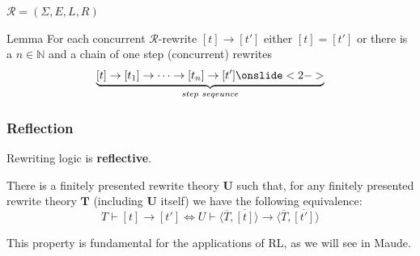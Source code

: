 \documentclass{beamer}
\begin{document}
\begin{frame}
    $\mathcal{R} = (\Sigma, E, L, R)$
    \small
    \begin{block}{Lemma}
        For each concurrent $\mathcal{R}$-rewrite $[t] \rightarrow [t']$
        either $[t] = [t']$ or there is a $n  \in \mathbb{N} $ and a chain  of one step (concurrent) rewrites 
        $$
        \underbrace{[t] \rightarrow [t_1] \rightarrow \cdots \rightarrow [t_n] \rightarrow [t'] \onslide<2->}_{step\ seqeunce}
        $$ 
    \end{block}


\end{frame}
\begin{frame}
    \frametitle{Reflection}

    Rewriting logic is \textbf{reflective}.

    \pause 
    \bigskip 
    There is a finitely presented rewrite theory $\mathbf{U}$ such that, for 
        any finitely presented rewrite theory $\mathbf{T}$ (including $\mathbf{U}$ itself) we have 
        the following equivalence:
        $$
        T \vdash [t] \rightarrow [t'] \Longleftrightarrow U \vdash  \langle \overline{T},\overline{[t]} \rangle  \rightarrow \langle \overline{T},\overline{[t']} \rangle
        $$ 

    \pause 
    This property is fundamental for the applications of RL, as we will see in Maude.
\end{frame}
\end{document}
